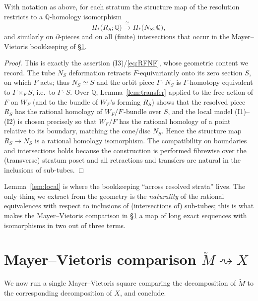 \documentclass[12pt]{article}
\begin{document}
\begin{lemma}\label{lem:local}
With notation as above, for each stratum the structure map of the resolution
restricts to a $\mathbb{Q}$-homology isomorphism
\[
  H_*\!\bigl(R_S;\mathbb{Q}\bigr)\xrightarrow{\ \cong\ }H_*\!\bigl(N_S;\mathbb{Q}\bigr),
\]
and similarly on $\partial$-pieces and on all (finite) intersections that
occur in the Mayer--Vietoris bookkeeping of \S\ref{sec:mv}.
\end{lemma}

\begin{proof}
This is exactly the assertion (I3)/\eqref{eq:RFNF}, whose geometric content we
record. The tube $N_S$ deformation retracts $F$-equivariantly onto its zero
section $S$, on which $F$ acts; thus $N_S\simeq S$ and the orbit piece
$\Gamma\cdot N_S$ is $\Gamma$-homotopy equivalent to $\Gamma\times_F S$,
i.e.\ to $\Gamma\cdot S$. Over $\mathbb{Q}$, Lemma~\ref{lem:transfer} applied
to the free action of $F$ on $W_F$ (and to the bundle of $W_F$'s forming
$R_S$) shows that the resolved piece $R_S$ has the rational homology of
$W_F/F\,$-bundle over $S$, and the local model (I1)--(I2) is chosen precisely
so that $W_F/F$ has the rational homology of a point relative to its boundary,
matching the cone/disc $N_S$. Hence the structure map $R_S\to N_S$ is a
rational homology isomorphism. The compatibility on boundaries and
intersections holds because the construction is performed fibrewise over the
(transverse) stratum poset and all retractions and transfers are natural in
the inclusions of sub-tubes.
\end{proof}

\begin{remark}
Lemma~\ref{lem:local} is where the bookkeeping ``across resolved strata''
lives. The only thing we extract from the geometry is the \emph{naturality}
of the rational equivalences with respect to inclusions of (intersections of)
sub-tubes; this is what makes the Mayer--Vietoris comparison in
\S\ref{sec:mv} a map of long exact sequences with isomorphisms in two out of
three terms.
\end{remark}

\section{Mayer--Vietoris comparison $\widetilde M \rightsquigarrow X$}\label{sec:mv}

We now run a single Mayer--Vietoris square comparing the decomposition of
$\widetilde M$ to the corresponding decomposition of $X$, and conclude.
\end{document}
